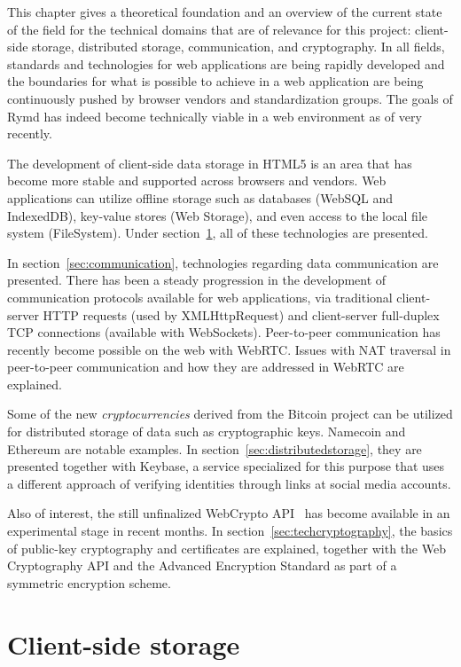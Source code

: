This chapter gives a theoretical foundation and an overview of the current state of the field for the technical domains that are of relevance for this project: client-side storage, distributed storage, communication, and cryptography. In all fields, standards and technologies for web applications are being rapidly developed and the boundaries for what is possible to achieve in a web application are being continuously pushed by browser vendors and standardization groups. The goals of Rymd has indeed become technically viable in a web environment as of very recently.

The development of client-side data storage in HTML5 is an area that has become more stable and supported across browsers and vendors. Web applications can utilize offline storage such as databases (WebSQL and IndexedDB), key-value stores (Web Storage), and even access to the local file system (FileSystem). Under section~\ref{sec:clientstorage}, all of these technologies are presented.

In section~\ref{sec:communication}, technologies regarding data communication are presented. There has been a steady progression in the development of communication protocols available for web applications, via traditional client-server HTTP requests (used by XMLHttpRequest) and client-server full-duplex TCP connections (available with WebSockets). Peer-to-peer communication has recently become possible on the web with WebRTC. Issues with NAT traversal in peer-to-peer communication and how they are addressed in WebRTC are explained.

Some of the new \emph{cryptocurrencies} derived from the Bitcoin project can be utilized for distributed storage of data such as cryptographic keys. Namecoin and Ethereum are notable examples. In section~\ref{sec:distributedstorage}, they are presented together with Keybase, a service specialized for this purpose that uses a different approach of verifying identities through links at social media accounts.

Also of interest, the still unfinalized WebCrypto API~\cite{WebCrypto:Online} has become available in an experimental stage in recent months. In section~\ref{sec:techcryptography}, the basics of public-key cryptography and certificates are explained, together with the Web Cryptography API and the Advanced Encryption Standard as part of a symmetric encryption scheme.

\section{Client-side storage}
\label{sec:clientstorage}

